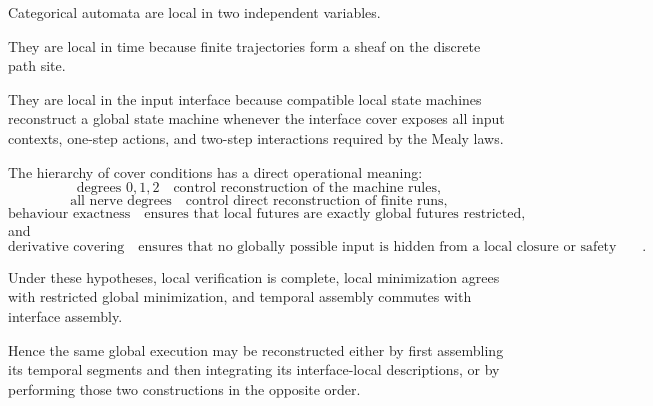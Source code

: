 \begin{remark}
\label{rem:interface-descent-final-conceptual-summary}
Categorical automata are local in two independent variables.

They are local in time because finite trajectories form a sheaf on the
discrete path site.

They are local in the input interface because compatible local state machines
reconstruct a global state machine whenever the interface cover exposes all
input contexts, one-step actions, and two-step interactions required by the
Mealy laws.

The hierarchy of cover conditions has a direct operational meaning:
\[
    \text{degrees }0,1,2
    \quad\text{control reconstruction of the machine rules},
\]
\[
    \text{all nerve degrees}
    \quad\text{control direct reconstruction of finite runs},
\]
\[
    \text{behaviour exactness}
    \quad\text{ensures that local futures are exactly global futures
    restricted},
\]
and
\[
    \text{derivative covering}
    \quad\text{ensures that no globally possible input is hidden from a local
    closure or safety calculation}.
\]

Under these hypotheses, local verification is complete, local minimization
agrees with restricted global minimization, and temporal assembly commutes
with interface assembly.

Hence the same global execution may be reconstructed either by first
assembling its temporal segments and then integrating its interface-local
descriptions, or by performing those two constructions in the opposite order.
\end{remark}